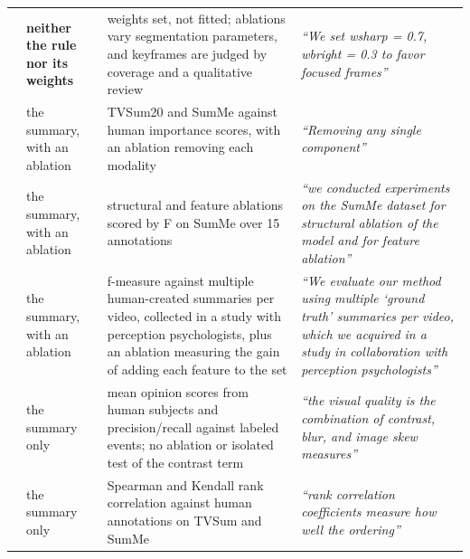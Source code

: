 \begin{table}[!ht]
\begin{tabular}{@{}>{\raggedright\arraybackslash}p{2.1cm}>{\raggedright\arraybackslash}p{2.4cm}>{\raggedright\arraybackslash}p{3.5cm}>{\raggedright\arraybackslash}p{3.6cm}@{}}
\rowcolor{perf1!45}\citet{korolkov2025keyframe} & \textbf{neither the rule nor its weights} & weights set, not fitted; ablations vary segmentation parameters, and keyframes are judged by coverage and a qualitative review & \emph{``We set wsharp = 0.7, wbright = 0.3 to favor focused frames''} \\
\rowcolor{perf3!55}\citet{cakmak2025tripss} & the summary, with an ablation & TVSum20 and SumMe against human importance scores, with an ablation removing each modality & \emph{``Removing any single component''} \\
\rowcolor{perf3!55}\citet{yang2024keyframe} & the summary, with an ablation & structural and feature ablations scored by F on SumMe over 15 annotations & \emph{``we conducted experiments on the SumMe dataset for structural ablation of the model and for feature ablation''} \\
\rowcolor{perf3!55}\citet{gygli2014summe} & the summary, with an ablation & f-measure against multiple human-created summaries per video, collected in a study with perception psychologists, plus an ablation measuring the gain of adding each feature to the set & \emph{``We evaluate our method using multiple `ground truth' summaries per video, which we acquired in a study in collaboration with perception psychologists''} \\
\rowcolor{perf2!45}\citet{jeong2016static} & the summary only & mean opinion scores from human subjects and precision/recall against labeled events; no ablation or isolated test of the contrast term & \emph{``the visual quality is the combination of contrast, blur, and image skew measures''} \\
\rowcolor{perf2!45}\citet{huang2024aesthetic} & the summary only & Spearman and Kendall rank correlation against human annotations on TVSum and SumMe & \emph{``rank correlation coefficients measure how well the ordering''} \\
\midrule
\bottomrule
\end{tabular}
\end{table}
